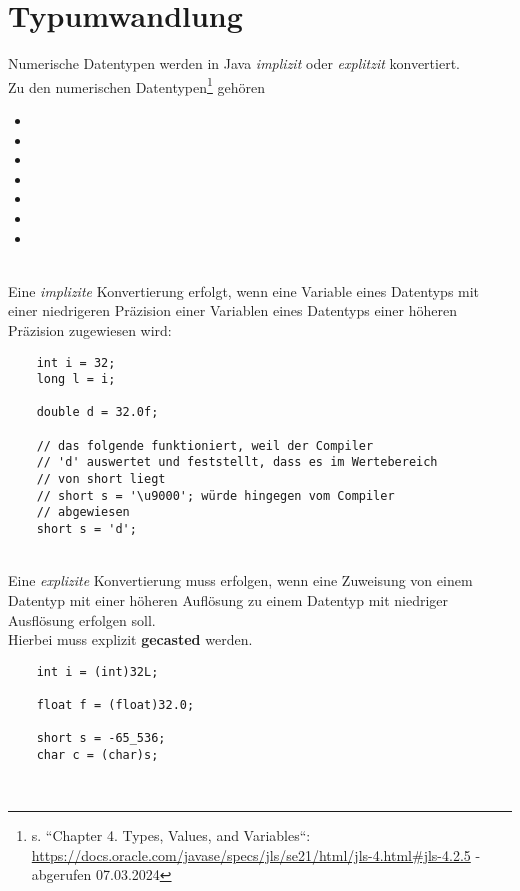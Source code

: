 \section{Typumwandlung}


Numerische Datentypen werden in Java \textit{implizit} oder \textit{explitzit} konvertiert.\\

\noindent
Zu den numerischen Datentypen\footnote{
s. ``Chapter 4. Types, Values, and Variables``: \url{https://docs.oracle.com/javase/specs/jls/se21/html/jls-4.html#jls-4.2.5} - abgerufen 07.03.2024
} gehören

\begin{itemize}
    \item {}
    \item {}
    \item {}
    \item {}
    \item {}
    \item {}
    \item {}
\end{itemize}\\



\noindent
Eine \textit{implizite} Konvertierung erfolgt, wenn eine Variable eines Datentyps mit einer niedrigeren Präzision einer Variablen eines Datentyps einer höheren Präzision zugewiesen wird:

\begin{verbatim}
    int i = 32;
    long l = i;

    double d = 32.0f;

    // das folgende funktioniert, weil der Compiler
    // 'd' auswertet und feststellt, dass es im Wertebereich
    // von short liegt
    // short s = '\u9000'; würde hingegen vom Compiler
    // abgewiesen
    short s = 'd';
\end{verbatim}\\

\noindent
Eine \textit{explizite} Konvertierung muss erfolgen, wenn eine Zuweisung von einem Datentyp mit einer höheren Auflösung zu einem Datentyp mit niedriger Ausflösung erfolgen soll.\\
Hierbei muss explizit \textbf{gecasted} werden.

\begin{verbatim}
    int i = (int)32L;

    float f = (float)32.0;

    short s = -65_536;
    char c = (char)s;
\end{verbatim}\\

